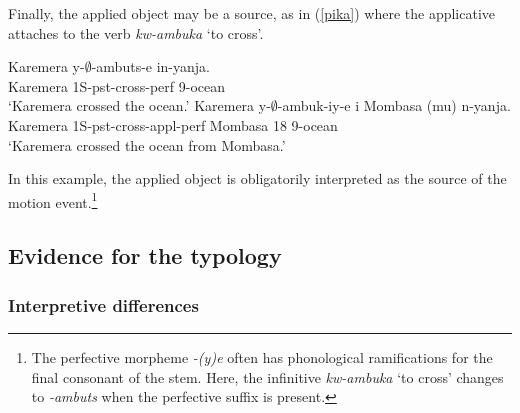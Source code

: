 \documentclass[output=paper]{langsci/langscibook}
\begin{document}
 Finally, the applied object may be a {\sc source}, as in (\ref{pika}) where the applicative attaches to the verb \emph{kw-ambuka} `to cross'.
 \begin{exe}
	\ex\label{pika}\begin{xlist}
		\ex \gll Karemera y-$\emptyset$-ambuts-e in-yanja.\\
			Karemera 1S-{\sc pst}-cross-{\sc perf} 9-ocean\\
			\glt `Karemera crossed the ocean.'
		\ex\gll Karemera y-$\emptyset$-ambuk-iy-e  i Mombasa (mu) n-yanja.\\
			Karemera 1S-{\sc pst}-cross-{\sc appl-perf}  {} Mombasa \phantom{(}18 9-ocean\\
			\glt `Karemera crossed the ocean from Mombasa.'
		\end{xlist}
\end{exe}
In this example, the applied object is obligatorily interpreted as the {\sc source} of the motion event.\footnote{The perfective morpheme \emph{-(y)e} often has phonological ramifications for the final consonant of the stem. Here, the infinitive \emph{kw-ambuka} `to cross' changes to \emph{-ambuts} when the perfective suffix is present.} 

 



\subsection{Evidence for the typology}%


\subsubsection{Interpretive differences}%
\end{document}
